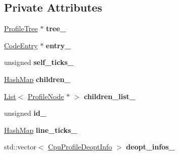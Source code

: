 \subsection*{Private Attributes}
\begin{DoxyCompactItemize}
\item 
\hyperlink{classv8_1_1internal_1_1_profile_tree}{Profile\+Tree} $\ast$ {\bfseries tree\+\_\+}\hypertarget{classv8_1_1internal_1_1_profile_node_a95ffcc86cc201a6b62b3e5db28c3b8a0}{}\label{classv8_1_1internal_1_1_profile_node_a95ffcc86cc201a6b62b3e5db28c3b8a0}

\item 
\hyperlink{classv8_1_1internal_1_1_code_entry}{Code\+Entry} $\ast$ {\bfseries entry\+\_\+}\hypertarget{classv8_1_1internal_1_1_profile_node_a17419f0e9ea349339e44a9882246988d}{}\label{classv8_1_1internal_1_1_profile_node_a17419f0e9ea349339e44a9882246988d}

\item 
unsigned {\bfseries self\+\_\+ticks\+\_\+}\hypertarget{classv8_1_1internal_1_1_profile_node_a055ff62f17af6dacd8315d7f0c574b93}{}\label{classv8_1_1internal_1_1_profile_node_a055ff62f17af6dacd8315d7f0c574b93}

\item 
\hyperlink{classv8_1_1internal_1_1_template_hash_map_impl}{Hash\+Map} {\bfseries children\+\_\+}\hypertarget{classv8_1_1internal_1_1_profile_node_ad5f2606af523be43064899243ab0187d}{}\label{classv8_1_1internal_1_1_profile_node_ad5f2606af523be43064899243ab0187d}

\item 
\hyperlink{classv8_1_1internal_1_1_list}{List}$<$ \hyperlink{classv8_1_1internal_1_1_profile_node}{Profile\+Node} $\ast$ $>$ {\bfseries children\+\_\+list\+\_\+}\hypertarget{classv8_1_1internal_1_1_profile_node_af89fe679aefa474a1ff3397486dcc02a}{}\label{classv8_1_1internal_1_1_profile_node_af89fe679aefa474a1ff3397486dcc02a}

\item 
unsigned {\bfseries id\+\_\+}\hypertarget{classv8_1_1internal_1_1_profile_node_ae8481feeaa84904bc894cc00da7720cf}{}\label{classv8_1_1internal_1_1_profile_node_ae8481feeaa84904bc894cc00da7720cf}

\item 
\hyperlink{classv8_1_1internal_1_1_template_hash_map_impl}{Hash\+Map} {\bfseries line\+\_\+ticks\+\_\+}\hypertarget{classv8_1_1internal_1_1_profile_node_a350959d6f9e00ff6f830031a2d9f5be1}{}\label{classv8_1_1internal_1_1_profile_node_a350959d6f9e00ff6f830031a2d9f5be1}

\item 
std\+::vector$<$ \hyperlink{structv8_1_1_cpu_profile_deopt_info}{Cpu\+Profile\+Deopt\+Info} $>$ {\bfseries deopt\+\_\+infos\+\_\+}\hypertarget{classv8_1_1internal_1_1_profile_node_a06173625ff00433b333748aa6d47b318}{}\label{classv8_1_1internal_1_1_profile_node_a06173625ff00433b333748aa6d47b318}

\end{DoxyCompactItemize}


